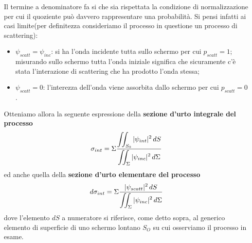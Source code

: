 Il termine a denominatore fa si che sia rispettata la condizione di normalizzazione per cui il quoziente può davvero
rappresentare una probabilità.
Si pensi infatti ai casi limite(per definitezza consideriamo il processo in questione un processo di scattering):
\begin{itemize}
	\item $\psi_{scatt} = \psi_{inc}$: si ha l'onda incidente tutta sullo schermo per cui $ p_{scatt} = 1$;
	misurando sullo schermo tutta l’onda iniziale significa che sicuramente c’è stata l’interazione di
	scattering che ha prodotto l’onda stessa;
	\item $ \psi_{scatt} = 0$: l'interezza dell'onda viene assorbita dallo schermo per cui $ p_{scatt} = 0$.
\end{itemize}
Otteniamo allora la seguente espressione della \textbf{sezione d'urto integrale del processo}
\begin{equation}
	\sigma_{int} = \Sigma \fraclarg{\iint_{S_0} |\psi_{int}|^2 \, dS}{\iint_{\Sigma}|\psi_{inc}|^2 \, d \Sigma}
	\label{eq:integral-interaction-cross-section}
\end{equation}
ed anche quella della \textbf{sezione d'urto elementare del processo}
\begin{equation}
	d \sigma_{int} = \Sigma \fraclarg{|\psi_{scatt}|^2 \, dS}{\iint_{\Sigma}|\psi_{inc}|^2 \, d \Sigma}
	\label{eq:differential-interaction-cross-section}
\end{equation}
dove l'elemento \(dS\) a numeratore si riferisce, come
detto sopra, al generico elemento di superficie di uno schermo lontano
\(S_O\) su cui osserviamo il processo in esame.
%
%

